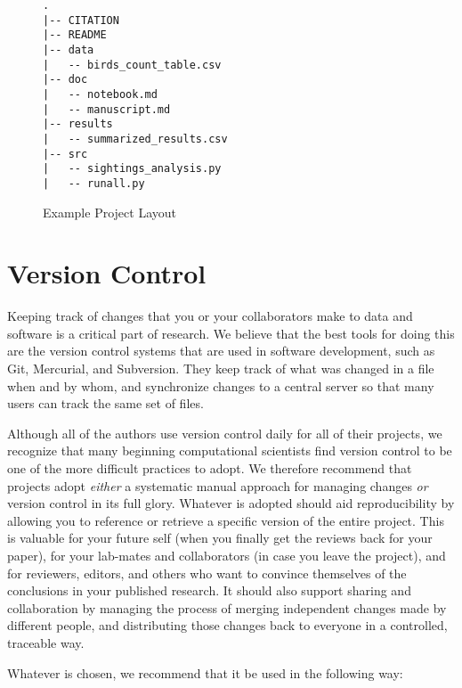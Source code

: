 \documentclass[10pt]{article}
\begin{document}
\begin{figure}
\begin{verbatim}
.
|-- CITATION
|-- README
|-- data
|   -- birds_count_table.csv
|-- doc
|   -- notebook.md
|   -- manuscript.md
|-- results
|   -- summarized_results.csv
|-- src
|   -- sightings_analysis.py
|   -- runall.py
\end{verbatim}
\caption{Example Project Layout}
\label{fig:layout}
\end{figure}

\section{Version Control}\label{sec:versioning}

Keeping track of changes that you or your collaborators make to data
and software is a critical part of research.  We believe that the best
tools for doing this are the version control systems that are used in
software development, such as Git, Mercurial, and Subversion.  They
keep track of what was changed in a file when and by whom, and
synchronize changes to a central server so that many users can track
the same set of files.

Although all of the authors use version control daily for all of their
projects, we recognize that many beginning computational scientists
find version control to be one of the more difficult practices to
adopt.  We therefore recommend that projects adopt \emph{either} a
systematic manual approach for managing changes \emph{or} version
control in its full glory.  Whatever is adopted should aid
reproducibility by allowing you to reference or retrieve a specific
version of the entire project. This is valuable for your future self
(when you finally get the reviews back for your paper), for your
lab-mates and collaborators (in case you leave the project), and for
reviewers, editors, and others who want to convince themselves of the
conclusions in your published research.  It should also support
sharing and collaboration by managing the process of merging
independent changes made by different people, and distributing those
changes back to everyone in a controlled, traceable way.

Whatever is chosen, we recommend that it be used in the following way:
\end{document}
